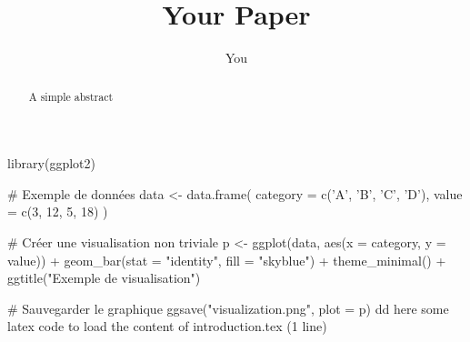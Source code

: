 \documentclass{article}
\title{Your Paper}
\author{You}
\begin{document}
\maketitle
\begin{abstract}
A simple abstract
\end{abstract}

library(ggplot2)

# Exemple de données
data <- data.frame(
  category = c('A', 'B', 'C', 'D'),
  value = c(3, 12, 5, 18)
)

# Créer une visualisation non triviale
p <- ggplot(data, aes(x = category, y = value)) +
  geom_bar(stat = "identity", fill = "skyblue") +
  theme_minimal() +
  ggtitle("Exemple de visualisation")

# Sauvegarder le graphique
ggsave("visualization.png", plot = p)
dd here some latex code to load the content of  introduction.tex (1 line)	



\end{document}
